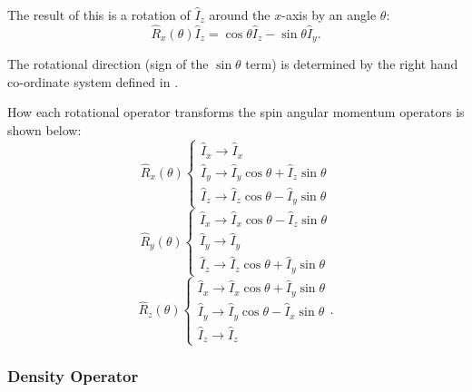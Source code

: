The result of this is a rotation of $\hat{I}_z$ around the $x$-axis by an angle $\theta$:
\begin{equation}
  \hat{R}_x(\theta)\hat{I}_z = \cos{\theta}\hat{I}_z - \sin{\theta}\hat{I}_y.
\end{equation}

The rotational direction (sign of the $\sin{\theta}$ term) is determined by the right hand co-ordinate system defined in .

How each rotational operator transforms the spin angular momentum operators is shown
below:
\begin{equation}
  \hat{R}_x(\theta) \begin{cases}
    \hat{I}_x \rightarrow \hat{I}_x \\
    \hat{I}_y \rightarrow \hat{I}_y\cos\theta + \hat{I}_z\sin\theta \\
    \hat{I}_z \rightarrow \hat{I}_z\cos\theta - \hat{I}_y\sin\theta
\end{cases}
\end{equation}
\begin{equation}
  \hat{R}_y(\theta) \begin{cases}
    \hat{I}_x \rightarrow \hat{I}_x\cos\theta - \hat{I}_z\sin\theta \\
    \hat{I}_y \rightarrow \hat{I}_y \\
    \hat{I}_z \rightarrow \hat{I}_z\cos\theta + \hat{I}_y\sin\theta
\end{cases}
\end{equation}
\begin{equation}
  \hat{R}_z(\theta) \begin{cases}
    \hat{I}_x \rightarrow \hat{I}_x\cos\theta + \hat{I}_y\sin\theta \\
    \hat{I}_y \rightarrow \hat{I}_y\cos\theta - \hat{I}_x\sin\theta \\
    \hat{I}_z \rightarrow \hat{I}_z
\end{cases}.
\end{equation}


\subsubsection{Density Operator}\label{Density}

